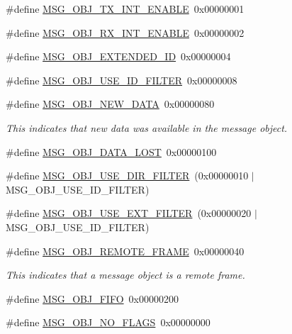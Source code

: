 \begin{DoxyCompactItemize}
\item 
\#define \hyperlink{group__can__api_ga72160bfa35ab86bf0e68c1e2c2dd67a2}{M\+S\+G\+\_\+\+O\+B\+J\+\_\+\+T\+X\+\_\+\+I\+N\+T\+\_\+\+E\+N\+A\+B\+LE}~0x00000001
\item 
\#define \hyperlink{group__can__api_ga8e611898e5a16c95b1e9ed517d84b463}{M\+S\+G\+\_\+\+O\+B\+J\+\_\+\+R\+X\+\_\+\+I\+N\+T\+\_\+\+E\+N\+A\+B\+LE}~0x00000002
\item 
\#define \hyperlink{group__can__api_ga9387d98cd6262e0be419aceab45295e4}{M\+S\+G\+\_\+\+O\+B\+J\+\_\+\+E\+X\+T\+E\+N\+D\+E\+D\+\_\+\+ID}~0x00000004
\item 
\#define \hyperlink{group__can__api_gac8b622ceb867ab7de6f285ae630c534a}{M\+S\+G\+\_\+\+O\+B\+J\+\_\+\+U\+S\+E\+\_\+\+I\+D\+\_\+\+F\+I\+L\+T\+ER}~0x00000008
\item 
\#define \hyperlink{group__can__api_ga3c0e245fe4dcf8cb1d987c6a4ff3fc0a}{M\+S\+G\+\_\+\+O\+B\+J\+\_\+\+N\+E\+W\+\_\+\+D\+A\+TA}~0x00000080\hypertarget{group__can__api_ga3c0e245fe4dcf8cb1d987c6a4ff3fc0a}{}\label{group__can__api_ga3c0e245fe4dcf8cb1d987c6a4ff3fc0a}

\begin{DoxyCompactList}\small\item\em This indicates that new data was available in the message object. \end{DoxyCompactList}\item 
\#define \hyperlink{group__can__api_ga6405afc8e3cc146889ea8bc32bd0f0ca}{M\+S\+G\+\_\+\+O\+B\+J\+\_\+\+D\+A\+T\+A\+\_\+\+L\+O\+ST}~0x00000100
\item 
\#define \hyperlink{group__can__api_gabd8bebbc78a6f49c3c3088c5c7d53ca9}{M\+S\+G\+\_\+\+O\+B\+J\+\_\+\+U\+S\+E\+\_\+\+D\+I\+R\+\_\+\+F\+I\+L\+T\+ER}~(0x00000010 $\vert$ M\+S\+G\+\_\+\+O\+B\+J\+\_\+\+U\+S\+E\+\_\+\+I\+D\+\_\+\+F\+I\+L\+T\+E\+R)
\item 
\#define \hyperlink{group__can__api_gacead63b8e758f947f7aecf11d928e490}{M\+S\+G\+\_\+\+O\+B\+J\+\_\+\+U\+S\+E\+\_\+\+E\+X\+T\+\_\+\+F\+I\+L\+T\+ER}~(0x00000020 $\vert$ M\+S\+G\+\_\+\+O\+B\+J\+\_\+\+U\+S\+E\+\_\+\+I\+D\+\_\+\+F\+I\+L\+T\+E\+R)
\item 
\#define \hyperlink{group__can__api_gaba15117b85b019f6e907fcadd0333a8f}{M\+S\+G\+\_\+\+O\+B\+J\+\_\+\+R\+E\+M\+O\+T\+E\+\_\+\+F\+R\+A\+ME}~0x00000040\hypertarget{group__can__api_gaba15117b85b019f6e907fcadd0333a8f}{}\label{group__can__api_gaba15117b85b019f6e907fcadd0333a8f}

\begin{DoxyCompactList}\small\item\em This indicates that a message object is a remote frame. \end{DoxyCompactList}\item 
\#define \hyperlink{group__can__api_ga5e3141ec2c5c1130f5c8c0601ce9e614}{M\+S\+G\+\_\+\+O\+B\+J\+\_\+\+F\+I\+FO}~0x00000200
\item 
\#define \hyperlink{group__can__api_gac72c7dc1fe5ae5e73682f9602e9c92c7}{M\+S\+G\+\_\+\+O\+B\+J\+\_\+\+N\+O\+\_\+\+F\+L\+A\+GS}~0x00000000\hypertarget{group__can__api_gac72c7dc1fe5ae5e73682f9602e9c92c7}{}\label{group__can__api_gac72c7dc1fe5ae5e73682f9602e9c92c7}


\end{DoxyCompactItemize}
